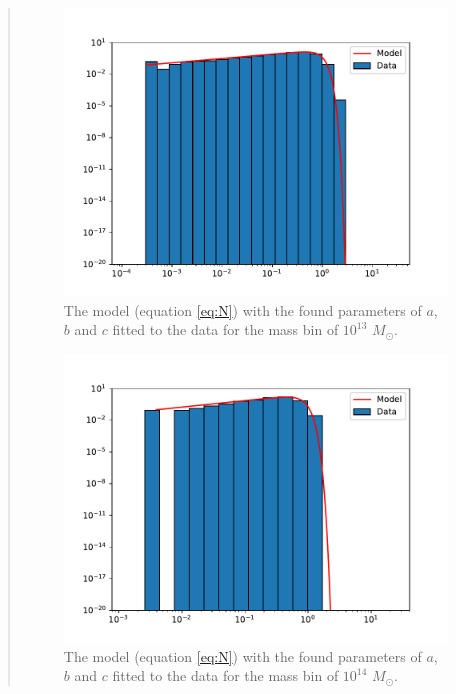 \begin{quote}
\begin{figure}[!h]
\end{figure}

\begin{figure}[!ht]
\centering
\includegraphics[scale=0.7]{plots/satgals_m13.pdf}
\caption{The model (equation \ref{eq:N}) with the found parameters of $a$, $b$ and $c$ fitted to the data for the mass bin of $10^{13}$ $M_{\odot}$.}
\end{figure}
\newpage
\begin{figure}[!hb]
\centering
\includegraphics[scale=0.7]{plots/satgals_m14.pdf}
\caption{The model (equation \ref{eq:N}) with the found parameters of $a$, $b$ and $c$ fitted to the data for the mass bin of $10^{14}$ $M_{\odot}$.}
\end{figure}



\end{quote}
